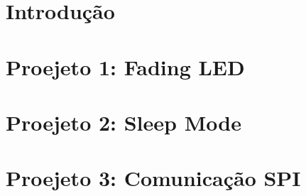 \documentclass[tcc2, pos-defesa, english, brazil]{packages/ufgrc}
\begin{document}
\textual

\chapter{Introdução}
\label{chapter:introducao}


\chapter{Proejeto 1: Fading LED}
\label{chapter:Fading LED}


\chapter{Proejeto 2: Sleep Mode}
\label{chapter:Sleep Mode}


\chapter{Proejeto 3: Comunicação SPI}
\label{chapter: Comunicação SPI}



% 

\postextual





\glsaddall
\printglossaries






\end{document}
